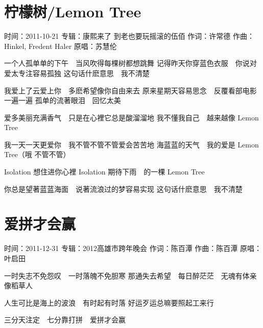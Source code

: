 \documentclass[UTF8,a4paper,oneside,twocolumn,12pt]{ctexbook}
\newcommand{\infopair}[2]{\textbullet #1：#2}
\newcommand{\zc}[1][伍佰]{\infopair{作词}{#1}}
\newcommand{\zq}[1][伍佰]{\infopair{作曲}{#1}}
\newcommand{\zj}[1]{\infopair{专辑}{#1}}
\newcommand{\yc}[1]{\infopair{原唱}{#1}}
\newcommand{\sj}[1]{\infopair{时间}{#1}}
\newenvironment{info}{\begin{flushleft}\kaishu
	}
	{\end{flushleft}\normalsize\yahei\par}
\newenvironment{lyric}{
	}
{}
\begin{document}
\section{柠檬树/Lemon Tree}
\begin{info}
	\sj{2011-10-21}
	\zj{康熙来了 到老也要玩摇滚的伍佰}
	\zc[许常德]
	\zq[Hinkel, Fredent Haler]
	\yc{苏慧伦}
\end{info}
\begin{lyric}
	一个人孤单单的下午　当风吹得每棵树都想跳舞
	记得昨天你穿蓝色衣服　你说对爱太专注容易孤独
	这句话什麽意思　我不清楚

	我爱上了云爱上你　多麽希望像你自由来去
	原来星期天容易思念　反覆看部电影一遍一遍
	孤单的流著眼泪　回忆太美

	爱多美丽充满香气　只是在心裡它总是酸溜溜地
	我不懂我自己　越来越像 Lemon Tree

	我一天一天更爱你　我不管不管不管爱会苦苦地
	海蓝蓝的天气　我的爱是 Lemon Tree（哦 不管不管）

	Isolation 想住进你心裡
	Isolation 期待下雨　的一棵 Lemon Tree

	你总是望著蓝蓝海面　说著流浪过的梦容易实现
	这句话什麽意思　我不清楚
\end{lyric}

\section{爱拼才会赢}
\begin{info}
	\sj{2011-12-31}
	\zj{2012高雄市跨年晚会}
	\zc[陈百潭]
	\zq[陈百潭]
	\yc{叶启田}
\end{info}
\begin{lyric}
	一时失志不免怨叹　一时落魄不免胆寒
	那通失去希望　每日醉茫茫　无魂有体亲像稻草人

	人生可比是海上的波浪　有时起有时落
	好运歹运总嘛要照起工来行

	三分天注定　七分靠打拼　爱拼才会赢
\end{lyric}
\end{document}
